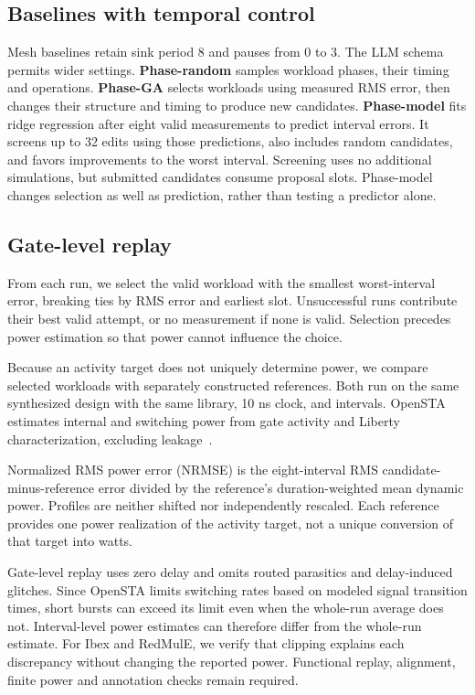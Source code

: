 \documentclass[conference]{IEEEtran}
\begin{document}
\subsection{Baselines with temporal control}
Mesh baselines retain sink period 8 and pauses from 0 to 3.
The LLM schema permits wider settings.
\textbf{Phase-random} samples workload phases, their timing and operations.
\textbf{Phase-GA} selects workloads using measured RMS error, then changes
their structure and timing to produce new candidates.
\textbf{Phase-model} fits ridge regression after eight valid measurements to
predict interval errors. It screens up to 32 edits using those predictions,
also includes random candidates, and favors improvements to the worst interval.
Screening uses no additional simulations, but submitted candidates consume
proposal slots. Phase-model changes selection
as well as prediction, rather than testing a predictor alone.

\subsection{Gate-level replay}
From each run, we select the valid workload with the smallest worst-interval
error, breaking ties by RMS error and earliest slot. Unsuccessful runs contribute
their best valid attempt, or no measurement if none is valid. Selection precedes
power estimation so that power cannot influence the choice.

Because an activity target does not uniquely determine power, we compare
selected workloads with separately constructed references. Both run on the same
synthesized design with the same library, 10 ns clock, and intervals. OpenSTA
estimates internal and switching power from gate activity and Liberty
characterization, excluding leakage~\cite{opensta}.

Normalized RMS power error (NRMSE) is the eight-interval RMS
candidate-minus-reference error divided by the reference's duration-weighted
mean dynamic power. Profiles are neither shifted nor independently rescaled.
Each reference provides one power realization of the activity target,
not a unique conversion of that target into watts.

Gate-level replay uses zero delay and omits routed parasitics and delay-induced
glitches. Since OpenSTA limits switching rates based on modeled signal transition
times, short bursts can exceed its limit even when the whole-run average does not.
Interval-level power estimates can therefore differ from the whole-run estimate.
For Ibex and RedMulE, we verify that clipping explains each discrepancy without
changing the reported power. Functional replay, alignment, finite power and
annotation checks remain required.
\end{document}

